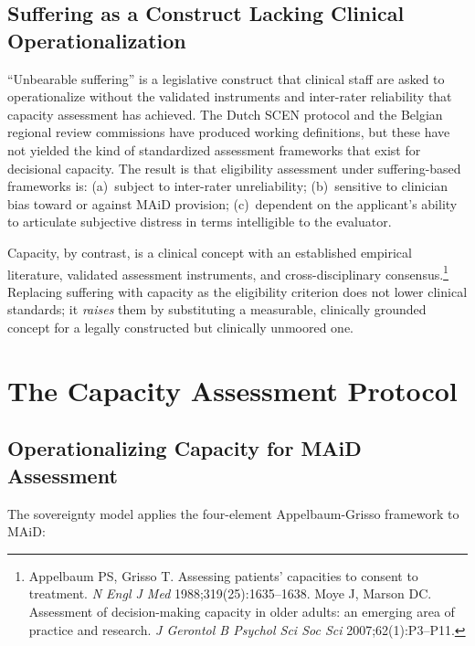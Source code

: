 \documentclass[11pt, letterpaper]{article}
\begin{document}
\subsection{Suffering as a Construct Lacking Clinical Operationalization}

``Unbearable suffering'' is a legislative construct that clinical staff are asked to
operationalize without the validated instruments and inter-rater reliability that
capacity assessment has achieved. The Dutch SCEN protocol and the Belgian regional
review commissions have produced working definitions, but these have not yielded
the kind of standardized assessment frameworks that exist for decisional capacity.
The result is that eligibility assessment under suffering-based frameworks is:
(a)~subject to inter-rater unreliability; (b)~sensitive to clinician bias toward or
against MAiD provision; (c)~dependent on the applicant's ability to articulate
subjective distress in terms intelligible to the evaluator.

Capacity, by contrast, is a clinical concept with an established empirical literature,
validated assessment instruments, and cross-disciplinary consensus.\footnote{%
  Appelbaum PS, Grisso T. Assessing patients' capacities to consent to treatment.
  \textit{N Engl J Med} 1988;319(25):1635--1638. Moye J, Marson DC. Assessment of
  decision-making capacity in older adults: an emerging area of practice and research.
  \textit{J Gerontol B Psychol Sci Soc Sci} 2007;62(1):P3--P11.}
Replacing suffering with capacity as the eligibility criterion does not lower clinical
standards; it \textit{raises} them by substituting a measurable, clinically grounded
concept for a legally constructed but clinically unmoored one.

\section{The Capacity Assessment Protocol}

\subsection{Operationalizing Capacity for MAiD Assessment}

The sovereignty model applies the four-element Appelbaum-Grisso framework to MAiD:
\end{document}
